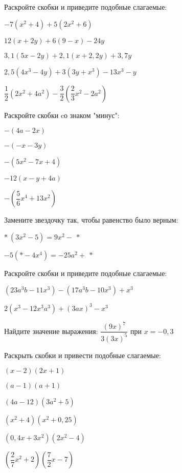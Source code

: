 %
%
\begin{class}[number=2]
	\begin{listofex}
		\item Раскройте скобки и приведите подобные слагаемые:
		\begin{enumcols}[itemcolumns=2]
			\item \( -7(x^2+4)+5(2x^2+6) \)
			\item \( 12(x+2y)+6(9-x)-24y \)
			\item \( 3,1(5x-2y)+2,1(x+2,2y)+3,7y \)
			\item \( 2,5(4x^3-4y)+3(3y+x^3)-13x^3-y\)
			\item \( \dfrac{1}{2}\left( 2x^2+4a^2 \right)-\dfrac{3}{2}\left( \dfrac{2}{3}x^2-2a^2 \right) \)
		\end{enumcols}
		\item Раскройте скобки cо знаком "минус":
		\begin{enumcols}[itemcolumns=3]
			\item \( -(4a-2x) \)
			\item \( -(-x-3y) \)
			\item \( -(5x^2-7x+4) \)
			\item \( -12(x-y+4a) \)
			\item \( -\left( \dfrac{5}{6}x^4+13x^2 \right) \)
		\end{enumcols}
		\item Замените звездочку так, чтобы равенство было верным:
		\begin{enumcols}[itemcolumns=2]
			\item \( *\:(3x^2-5)=9x^2-\:* \)
			\item \( -5(*-4x^4)=-25a^2+\:* \)
		\end{enumcols}
		\item Раскройте скобки и приведите подобные слагаемые:
		\begin{enumcols}[itemcolumns=2]
			\item \( (23a^3b-11x^3)-(17a^3b-10x^3)+x^3 \)
			\item \( 2(x^3-12x^3a^3)+(3ax)^3-x^3 \)
		\end{enumcols}
		\item Найдите значение выражения: \( \dfrac{(9x)^7}{3(3x)^5} \) при \( x=-0,3 \)
		\item Раскрыть скобки и привести подобные слагаемые:
		\begin{enumcols}[itemcolumns=3]
			\item \( (x-2)(2x+1) \)
			\item \( (a-1)(a+1) \)
			\item \( (4a-12)(3a^2+5) \)
			\item \( (x^2+4)(x^2+0,25) \)
			\item \( (0,4x+3x^2)(2x^2-4) \)
			\item \( \left( \dfrac{2}{7}x^2+2 \right)\left( \dfrac{7}{2}x-7 \right) \)
		\end{enumcols}
	\end{listofex}
\end{class}
